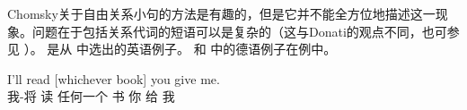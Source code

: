 
Chomsky关于自由关系小句的方法是有趣的，但是它并不能全方位地描述这一现象。问题在于包括关系代词的短语可以是复杂的（这与Donati的观点不同，也可参见 ）。 是从 \citet[]{BG78}中选出的英语例子。 和  中的德语例子在例中。

\ea
\gll I'll read [whichever book] you give me.\\
     我-将 读   \spacebr{}任何一个 书 你 给 我\\
\z

